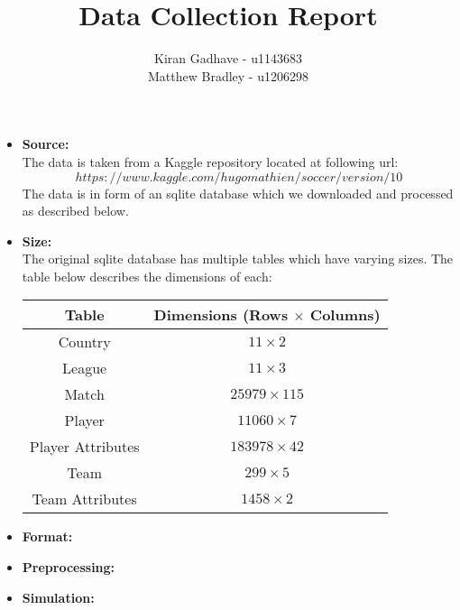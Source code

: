 \documentclass[12pt]{extarticle}
\title{Data Collection Report}
\author{Kiran Gadhave - u1143683\\Matthew Bradley - u1206298}
\newcommand{\<}{\langle}
\renewcommand{\>}{\rangle}
\theoremstyle{definition}
\begin{document}
\maketitle

\begin{itemize}

	\item \textbf{Source:}\\
	The data is taken from a Kaggle repository located at following url: 
	$$https://www.kaggle.com/hugomathien/soccer/version/10 $$
	The data is in form of an sqlite database which we downloaded and processed as described below.
	\item \textbf{Size:}\\
	The original sqlite database has multiple tables which have varying sizes. The table below describes the dimensions of each:
	\begin{table}[h!]
		\begin{center}
			\begin{tabular}{c|c}
				\textbf{Table} & \textbf{Dimensions (Rows $\times$ Columns)} \\
				\hline
				Country & $11 \times 2$\\
				League & $11 \times 3$\\
				Match & $25979 \times 115$\\
				Player & $11060 \times 7$\\
				Player Attributes & $183978 \times 42$\\
				Team & $299 \times 5$\\
				Team Attributes & $1458 \times 2$\\
			\end{tabular}
		\end{center}
	\end{table}
	\item \textbf{Format:}\\
	\item \textbf{Preprocessing:}\\
	\item \textbf{Simulation:}\\

\end{itemize}
\end{document}
